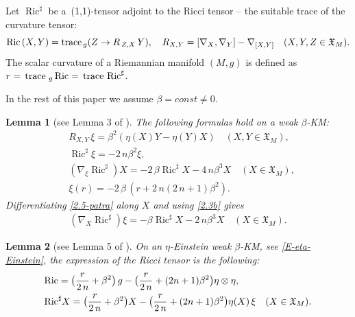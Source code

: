 \documentclass[11pt,a4paper,twoside]{article}
\newtheorem{lemma}{Lemma}%
\def\Ric{\operatorname{Ric}}
\def\tr{{\rm\,trace\,}}
\begin{document}
{Let $\Ric^\sharp$ be a~(1,1)-tensor adjoint to the {Ricci tensor}
-- the suitable trace of the curvature tensor:
\begin{equation*}
 {\rm Ric}\,(X,Y) = {\rm trace}_{\,g}(Z\to R_{\,Z,X}\,Y),\quad
 R_{X, Y} = [\nabla_{X},\nabla_{Y}] - \nabla_{[X,Y]}\quad (X,Y,Z\in\mathfrak{X}_M).
\end{equation*}
The scalar curvature of a Riemannian manifold $(M,g)$ is defined as ${r}=\tr_{\,g}\Ric=\tr\Ric^\sharp$.


In the rest of this paper we assume $\beta=const\ne0$.

\begin{lemma}[see Lemma 3 of \cite{rov-126}]
The following formulas hold on a weak $\beta$-KM:
\begin{align}\label{2.4}
 & R_{X, Y}\,\xi = \beta^2(\eta(X)Y - \eta(Y)X)\quad (X,Y\in\mathfrak{X}_M),\\
\label{2.5-patra}
 & \Ric^\sharp \xi = -2\,n\beta^2\xi ,\\
 \label{E-L-02b}
 & (\nabla_\xi\Ric^\sharp) X = -2\,\beta\Ric^\sharp X -4\,n\beta^3 X \quad (X\in\mathfrak{X}_M) ,\\
\label{3.1A-patra}
 &\xi({r}) = -2\,\beta\,({r}+2\,n(2\,n+1)\beta^2) .
\end{align}
Differentiating \eqref{2.5-patra} along $X$ and using \eqref{2.3b} gives %
\begin{align}\label{E-L-02a}
 (\nabla_X\Ric^\sharp)\xi=-\beta\Ric^\sharp X-2\,n\beta^3 X\quad (X\in\mathfrak{X}_M) .
\end{align}
\end{lemma}

\begin{lemma}[see  Lemma 5 of \cite{rov-126}]
On an $\eta$-Einstein weak $\beta$-KM, see \eqref{E-eta-Einstein},
the expression of the Ricci tensor is the following:
\begin{align}\label{E-42-proc}
\notag
 & {\rm Ric} = \big(\frac{{r}}{2\,n}+\beta^2\big)\,g -\big(\frac{{r}}{2\,n}+(2n+1)\beta^2\big)\eta\otimes\eta , \\
 & {\rm Ric}^\sharp X = \big(\frac{{r}}{2\,n}+\beta^2\big)X -\big(\frac{{r}}{2\,n}+(2n+1)\beta^2\big)\eta(X)\,\xi \quad (X\in\mathfrak{X}_M).
\end{align}
\end{lemma}



}
\end{document}
